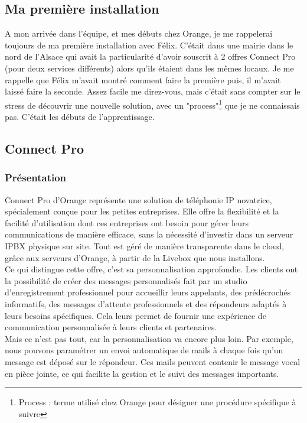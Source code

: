 \documentclass[12pt, a4paper]{article}
\begin{document}
\subsection{Ma première installation}
A mon arrivée dans l'équipe, et mes débuts chez Orange, 
je me rappelerai toujours de ma première installation 
avec Félix. C'était dans une mairie dans le nord
de l'Alsace qui avait la particularité d'avoir 
souscrit à 2 offres Connect Pro (pour deux services différents) 
alors qu'ils étaient dans les mêmes locaux. Je me rappelle que Félix m'avait
montré comment faire la première puis, il m'avait laissé
faire la seconde. Assez facile me direz-vous, mais
c'était sans compter sur le stress de découvrir 
une nouvelle solution, avec un "process"\footnote{Process : terme utilisé chez Orange pour désigner une procédure spécifique à suivre} que je ne connaissais 
pas. C'était les débuts de l'apprentissage. 

\subsection{Connect Pro}
\subsubsection{Présentation}
Connect Pro d'Orange représente une solution
de téléphonie IP novatrice, spécialement conçue pour
les petites entreprises. Elle offre la flexibilité et
la facilité d'utilisation dont ces entreprises ont
besoin pour gérer leurs communications de manière
efficace, sans la nécessité d'investir dans un
serveur IPBX physique sur site. Tout est géré de
manière transparente dans le cloud, grâce aux
serveurs d'Orange, à partir de la Livebox
que nous installons.\\

Ce qui distingue cette offre, c'est sa
personnalisation approfondie. Les clients ont
la possibilité de créer des messages personnalisés 
fait par un studio d'enregistrement professionnel 
pour accueillir leurs appelants, des prédécrochés
informatifs, des messages d'attente professionnels
et des répondeurs adaptés à leurs besoins spécifiques.
Cela leurs permet de fournir une expérience de
communication personnalisée à leurs clients
et partenaires.\\

Mais ce n'est pas tout, car la personnalisation
va encore plus loin. Par exemple, nous
pouvons paramétrer un envoi automatique de
mails à chaque fois qu'un message est déposé sur
le répondeur. Ces mails peuvent contenir le
message vocal en pièce jointe, ce qui
facilite la gestion et le suivi des messages importants.\\
\end{document}
